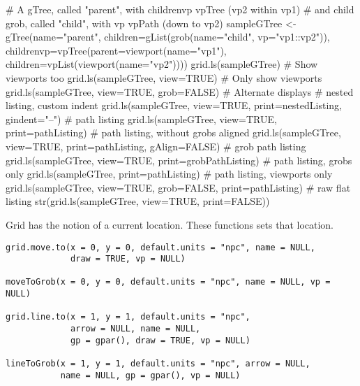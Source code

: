 \begin{Examples}
\begin{ExampleCode}
# A gTree, called "parent", with childrenvp vpTree (vp2 within vp1)
# and child grob, called "child", with vp vpPath (down to vp2)
sampleGTree <- gTree(name="parent",
                     children=gList(grob(name="child", vp="vp1::vp2")),
                     childrenvp=vpTree(parent=viewport(name="vp1"),
                                       children=vpList(viewport(name="vp2"))))
grid.ls(sampleGTree)
# Show viewports too
grid.ls(sampleGTree, view=TRUE)
# Only show viewports
grid.ls(sampleGTree, view=TRUE, grob=FALSE)
# Alternate displays
# nested listing, custom indent
grid.ls(sampleGTree, view=TRUE, print=nestedListing, gindent="--")
# path listing
grid.ls(sampleGTree, view=TRUE, print=pathListing)
# path listing, without grobs aligned
grid.ls(sampleGTree, view=TRUE, print=pathListing, gAlign=FALSE)
# grob path listing 
grid.ls(sampleGTree, view=TRUE, print=grobPathListing)
# path listing, grobs only
grid.ls(sampleGTree, print=pathListing)
# path listing, viewports only
grid.ls(sampleGTree, view=TRUE, grob=FALSE, print=pathListing)
# raw flat listing
str(grid.ls(sampleGTree, view=TRUE, print=FALSE))
\end{ExampleCode}
\end{Examples}
%
\begin{Description}\relax
Grid has the notion of a current location.  These functions
sets that location.
\end{Description}
%
\begin{Usage}
\begin{verbatim}
grid.move.to(x = 0, y = 0, default.units = "npc", name = NULL,
             draw = TRUE, vp = NULL)

moveToGrob(x = 0, y = 0, default.units = "npc", name = NULL, vp = NULL)

grid.line.to(x = 1, y = 1, default.units = "npc",
             arrow = NULL, name = NULL,
             gp = gpar(), draw = TRUE, vp = NULL)

lineToGrob(x = 1, y = 1, default.units = "npc", arrow = NULL,
           name = NULL, gp = gpar(), vp = NULL)
\end{verbatim}
\end{Usage}
%
